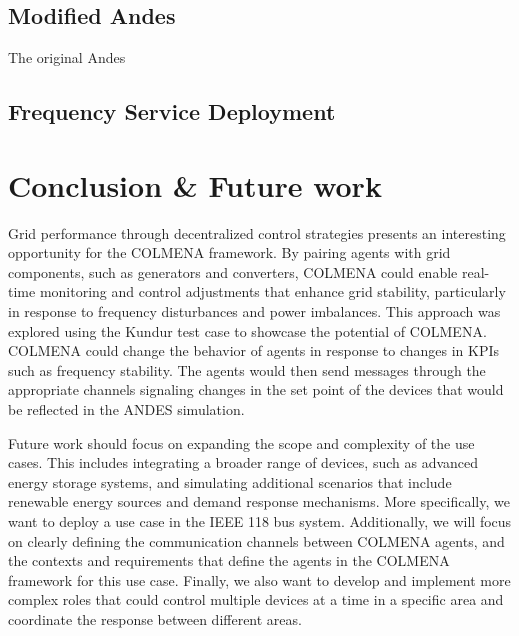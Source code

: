 \documentclass{article}
\begin{document}
\subsection{Modified Andes}

The original Andes 

\subsection{Frequency Service Deployment}


\section{Conclusion \& Future work}

Grid performance through decentralized control strategies presents an interesting opportunity for the COLMENA framework. By pairing agents with grid components, such as generators and converters, COLMENA could enable real-time monitoring and control adjustments that enhance grid stability, particularly in response to frequency disturbances and power imbalances. This approach was explored using the Kundur test case to showcase the potential of COLMENA. COLMENA could change the behavior of agents in response to changes in KPIs such as frequency stability. The agents would then send messages through the appropriate channels signaling changes in the set point of the devices that would be reflected in the ANDES simulation.

Future work should focus on expanding the scope and complexity of the use cases. This includes integrating a broader range of devices, such as advanced energy storage systems, and simulating additional scenarios that include renewable energy sources and demand response mechanisms. More specifically, we want to deploy a use case in the IEEE 118 bus system. Additionally, we will focus on clearly defining the communication channels between COLMENA agents, and the contexts  and requirements that define the agents in the COLMENA framework for this use case. Finally, we also want to develop and implement more complex roles that could control multiple devices at a time in a specific area and coordinate the response between different areas.  


\nocite{*}
\printbibliography
\end{document}
